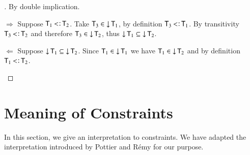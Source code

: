 \documentclass{report}
\begin{document}
  \begin{proof}[]
    By double implication.
    \begin{indcase}{$\Rightarrow$}
      Suppose $\type{T}_1\subtype\type{T}_2$.
      Take $\textsf{T}_3\in\mathop{\rm\downarrow}\nolimits\textsf{T}_1$, by definition $\type{T}_3\subtype\type{T}_1$.
      By transitivity  $\type{T}_3\subtype\type{T}_2$ and
      therefore $\textsf{T}_3\in\mathop{\rm\downarrow}\nolimits\textsf{T}_2$,
      thus $\mathop{\rm\downarrow}\nolimits\textsf{T}_1\subseteq\mathop{\rm\downarrow}\nolimits\textsf{T}_2$.
    \end{indcase}
    \begin{indcase}{$\Leftarrow$}
      Suppose $\mathop{\rm\downarrow}\nolimits\textsf{T}_1\subseteq\mathop{\rm\downarrow}\nolimits\textsf{T}_2$. Since
      $\textsf{T}_1\in\mathop{\rm\downarrow}\nolimits\textsf{T}_1$  we have
      $\textsf{T}_1\in\mathop{\rm\downarrow}\nolimits\textsf{T}_2$ and by definition $\type{T}_1\subtype\type{T}_2$.
    \end{indcase}
  \end{proof}
  
  \section{Meaning of Constraints}
  In this section, we give an interpretation to constraints. We have adapted the
  interpretation introduced by Pottier and R\'emy \cite{pottierrows,pottier-remy-emlti} for our purpose.
  
\end{document}
